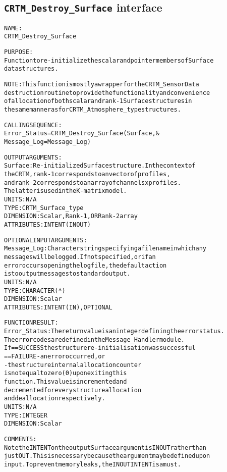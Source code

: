 \subsection{\texttt{CRTM\_Destroy\_Surface} interface}
  \label{sec:CRTM_Destroy_Surface_interface}
  \begin{alltt}
 
  NAME:
        CRTM_Destroy_Surface
  
  PURPOSE:
        Function to re-initialize the scalar and pointer members of Surface
        data structures.
 
        NOTE: This function is mostly a wrapper for the CRTM_SensorData
              destruction routine to provide the functionality and convenience
              of allocation of both scalar and rank-1 Surface structures in
              the same manner as for CRTM_Atmosphere_type structures.
 
  CALLING SEQUENCE:
        Error_Status = CRTM_Destroy_Surface( Surface                , &
                                             Message_Log=Message_Log  )
 
  OUTPUT ARGUMENTS:
        Surface:      Re-initialized Surface structure. In the context of
                      the CRTM, rank-1 corresponds to an vector of profiles,
                      and rank-2 corresponds to an array of channels x profiles.
                      The latter is used in the K-matrix model.
                      UNITS:      N/A
                      TYPE:       CRTM_Surface_type
                      DIMENSION:  Scalar, Rank-1, OR Rank-2 array
                      ATTRIBUTES: INTENT(IN OUT)
 
  OPTIONAL INPUT ARGUMENTS:
        Message_Log:  Character string specifying a filename in which any
                      messages will be logged. If not specified, or if an
                      error occurs opening the log file, the default action
                      is to output messages to standard output.
                      UNITS:      N/A
                      TYPE:       CHARACTER(*)
                      DIMENSION:  Scalar
                      ATTRIBUTES: INTENT(IN), OPTIONAL
 
  FUNCTION RESULT:
        Error_Status: The return value is an integer defining the error status.
                      The error codes are defined in the Message_Handler module.
                      If == SUCCESS the structure re-initialisation was successful
                         == FAILURE - an error occurred, or
                                    - the structure internal allocation counter
                                      is not equal to zero (0) upon exiting this
                                      function. This value is incremented and
                                      decremented for every structure allocation
                                      and deallocation respectively.
                      UNITS:      N/A
                      TYPE:       INTEGER
                      DIMENSION:  Scalar
 
  COMMENTS:
        Note the INTENT on the output Surface argument is IN OUT rather than
        just OUT. This is necessary because the argument may be defined upon
        input. To prevent memory leaks, the IN OUT INTENT is a must.
 
  \end{alltt}

